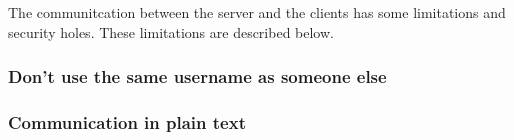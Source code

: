 The communitcation between the server and the clients has some limitations and security holes. These limitations are described below.
\subsubsection{Don't use the same username as someone else}

\subsubsection{Communication in plain text}

\subsubsection{}
